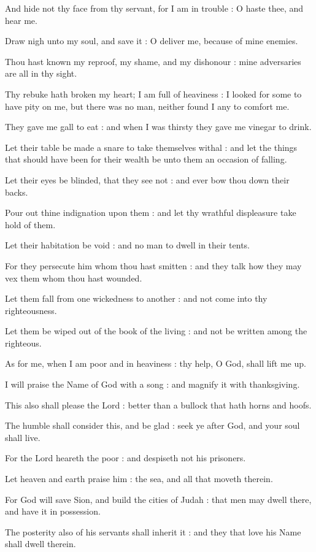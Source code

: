 And hide not thy face from thy servant, for I am in trouble : O haste thee, and hear me.\par
{}Draw nigh unto my soul, and save it : O deliver me, because of mine enemies.\par
{}Thou hast known my reproof, my shame, and my dishonour : mine adversaries are all in thy sight.\par
{}Thy rebuke hath broken my heart; I am full of heaviness : I looked for some to have pity on me, but there was no man, neither found I any to comfort me.\par
{}They gave me gall to eat : and when I was thirsty they gave me vinegar to drink.\par
{}Let their table be made a snare to take themselves withal : and let the things that should have been for their wealth be unto them an occasion of falling.\par
{}Let their eyes be blinded, that they see not : and ever bow thou down their backs.\par
{}Pour out thine indignation upon them : and let thy wrathful displeasure take hold of them.\par
{}Let their habitation be void : and no man to dwell in their tents.\par
{}For they persecute him whom thou hast smitten : and they talk how they may vex them whom thou hast wounded.\par
{}Let them fall from one wickedness to another : and not come into thy righteousness.\par
{}Let them be wiped out of the book of the living : and not be written among the righteous.\par
{}As for me, when I am poor and in heaviness : thy help, O God, shall lift me up.\par
{}I will praise the Name of God with a song : and magnify it with thanksgiving.\par
{}This also shall please the Lord : better than a bullock that hath horns and hoofs.\par
{}The humble shall consider this, and be glad : seek ye after God, and your soul shall live.\par
{}For the Lord heareth the poor : and despiseth not his prisoners.\par
{}Let heaven and earth praise him : the sea, and all that moveth therein.\par
{}For God will save Sion, and build the cities of Judah : that men may dwell there, and have it in possession.\par
{}The posterity also of his servants shall inherit it : and they that love his Name shall dwell therein.\par

